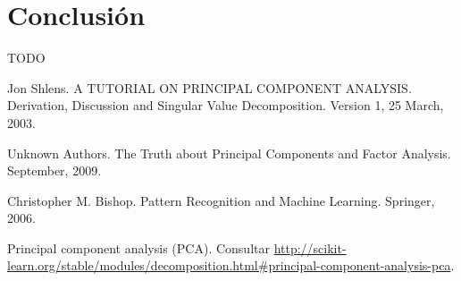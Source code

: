 \documentclass[11pt,spanish,listoffigures,listoftables]{tfgetsinf}
\begin{document}

\chapter{Conclusi\'on}

TODO


\begin{thebibliography}{10}

   Jon Shlens.
   \newblock A TUTORIAL ON PRINCIPAL COMPONENT ANALYSIS. Derivation, Discussion and Singular Value Decomposition.
   \newblock Version 1, 25 March, 2003.

   Unknown Authors.
   \newblock The Truth about Principal Components and Factor Analysis.
    September, 2009.
   
   Christopher M. Bishop.
   \newblock Pattern Recognition and Machine Learning.
   \newblock Springer, 2006.

   Principal component analysis (PCA). 
   \newblock Consultar 
   \url{http://scikit-learn.org/stable/modules/decomposition.html#principal-component-analysis-pca}.

\end{thebibliography}
\cleardoublepage

\end{document}

